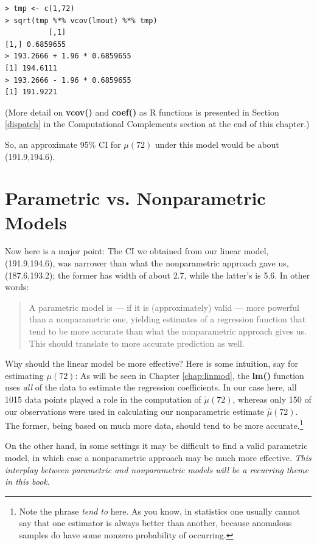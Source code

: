 \begin{lstlisting}
> tmp <- c(1,72)
> sqrt(tmp %*% vcov(lmout) %*% tmp)
          [,1]
[1,] 0.6859655
> 193.2666 + 1.96 * 0.6859655
[1] 194.6111
> 193.2666 - 1.96 * 0.6859655
[1] 191.9221
\end{lstlisting}

(More detail on {\bf vcov()} and {\bf coef()} as R functions is
presented in Section \ref{dispatch} in the Computational Complements
section at the end of this chapter.)

So, an approximate 95\% CI for $\mu(72)$ under this model would be about
(191.9,194.6). 

\section{Parametric vs. Nonparametric Models}
\label{parvsnonparmodels}

Now here is a major point:  The CI we obtained from our linear model,
(191.9,194.6), was narrower than what the nonparametric approach gave us,
(187.6,193.2); the former has width of about 2.7, while the latter's is
5.6.  In other words:

\begin{quote}

A parametric model is --- if it is (approximately) valid --- more powerful
than a nonparametric one, yielding estimates of a regression function
that tend to be more accurate than what the nonparametric approach gives
us.  This should translate to more accurate prediction as well.

\end{quote}

Why should the linear model be more effective?  Here is some intuition,
say for estimating $\mu(72)$:  As will be seen in Chapter
\ref{chap:linmod}, the {\bf lm()} function uses {\it all} of the data to
estimate the regression coefficients.  In our case here, all 1015 data
points played a role in the computation of $\check{\mu}(72)$, whereas
only 150 of our observations were used in calculating our nonparametric
estimate $\widehat{\mu}(72)$.  The former, being based on much more
data, should tend to be more accurate.\footnote{Note the phrase {\it
tend to} here.  As you know, in statistics one usually cannot say that
one estimator is always better than another, because anomalous samples
do have some nonzero probability of occurring.}

On the other hand, in some settings it may be difficult to find a valid
parametric model, in which case a nonparametric approach may be much
more effective.  {\it This interplay between parametric and
nonparametric models will be a recurring theme in this book.}

